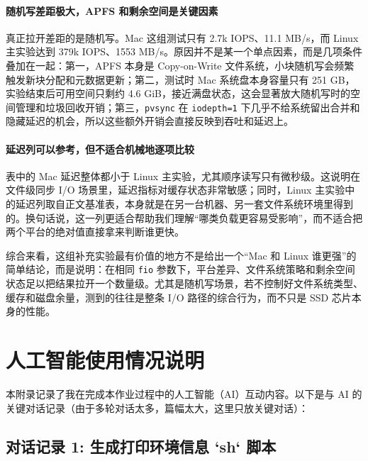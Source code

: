 \documentclass[a4paper]{article}
\begin{document}
\paragraph{随机写差距极大，APFS 和剩余空间是关键因素}
真正拉开差距的是随机写。Mac 这组测试只有 2.7k IOPS、11.1 MB/s，而 Linux 主实验达到 379k IOPS、1553 MB/s。原因并不是某一个单点因素，而是几项条件叠加在一起：第一，APFS 本身是 Copy-on-Write 文件系统，小块随机写会频繁触发新块分配和元数据更新；第二，测试时 Mac 系统盘本身容量只有 251 GB，实验结束后可用空间只剩约 4.6 GiB，接近满盘状态，这会显著放大随机写时的空间管理和垃圾回收开销；第三，\texttt{pvsync} 在 \texttt{iodepth=1} 下几乎不给系统留出合并和隐藏延迟的机会，所以这些额外开销会直接反映到吞吐和延迟上。

\paragraph{延迟列可以参考，但不适合机械地逐项比较}
表中的 Mac 延迟整体都小于 Linux 主实验，尤其顺序读写只有微秒级。这说明在文件级同步 I/O 场景里，延迟指标对缓存状态非常敏感；同时，Linux 主实验中的延迟列取自正文基准表，本身就是在另一台机器、另一套文件系统环境里得到的。换句话说，这一列更适合帮助我们理解“哪类负载更容易受影响”，而不适合把两个平台的绝对值直接拿来判断谁更快。

综合来看，这组补充实验最有价值的地方不是给出一个“Mac 和 Linux 谁更强”的简单结论，而是说明：在相同 \texttt{fio} 参数下，平台差异、文件系统策略和剩余空间状态足以把结果拉开一个数量级。尤其是随机写场景，若不控制好文件系统类型、缓存和磁盘余量，测到的往往是整条 I/O 路径的综合行为，而不只是 SSD 芯片本身的性能。


\newpage
\appendix
\section{人工智能使用情况说明}

本附录记录了我在完成本作业过程中的人工智能（AI）互动内容。以下是与 AI 的关键对话记录（由于多轮对话太多，篇幅太大，这里只放关键对话）：

\subsection{对话记录 1: 生成打印环境信息 `sh` 脚本}
\end{document}
